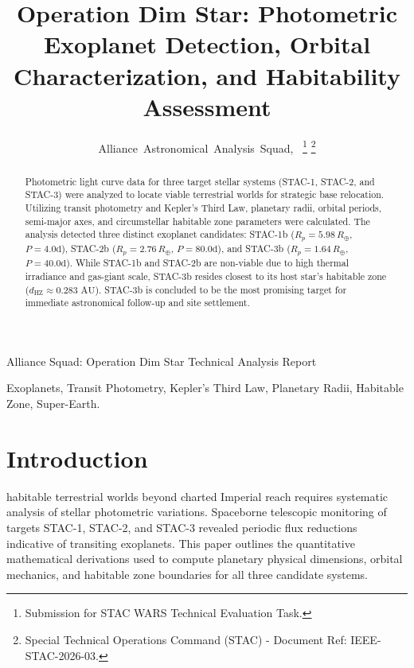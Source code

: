 \documentclass[journal,10pt,twocolumn]{IEEEtran}
\begin{document}
\title{Operation Dim Star: Photometric Exoplanet Detection, Orbital Characterization, and Habitability Assessment}

\author{Alliance~Astronomical~Analysis~Squad,~%
\thanks{Submission for STAC WARS Technical Evaluation Task.}%
\thanks{Special Technical Operations Command (STAC) - Document Ref: IEEE-STAC-2026-03.}}

%
{Alliance Squad: Operation Dim Star Technical Analysis Report}

\maketitle

\begin{abstract}
Photometric light curve data for three target stellar systems (STAC-1, STAC-2, and STAC-3) were analyzed to locate viable terrestrial worlds for strategic base relocation. Utilizing transit photometry and Kepler's Third Law, planetary radii, orbital periods, semi-major axes, and circumstellar habitable zone parameters were calculated. The analysis detected three distinct exoplanet candidates: STAC-1b ($R_p = 5.98\,R_\oplus$, $P = 4.0\text{d}$), STAC-2b ($R_p = 2.76\,R_\oplus$, $P = 80.0\text{d}$), and STAC-3b ($R_p = 1.64\,R_\oplus$, $P = 40.0\text{d}$). While STAC-1b and STAC-2b are non-viable due to high thermal irradiance and gas-giant scale, STAC-3b resides closest to its host star's habitable zone ($d_{\text{HZ}} \approx 0.283\text{ AU}$). STAC-3b is concluded to be the most promising target for immediate astronomical follow-up and site settlement.
\end{abstract}

\begin{IEEEkeywords}
Exoplanets, Transit Photometry, Kepler's Third Law, Planetary Radii, Habitable Zone, Super-Earth.
\end{IEEEkeywords}

\section{Introduction}
 habitable terrestrial worlds beyond charted Imperial reach requires systematic analysis of stellar photometric variations. Spaceborne telescopic monitoring of targets STAC-1, STAC-2, and STAC-3 revealed periodic flux reductions indicative of transiting exoplanets. This paper outlines the quantitative mathematical derivations used to compute planetary physical dimensions, orbital mechanics, and habitable zone boundaries for all three candidate systems.
\end{document}
